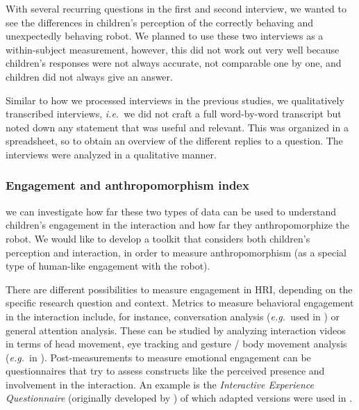 \documentclass{sig-alternate}
\newcommand{\eg}{{\textit{e.g.~}}}
\newcommand{\ie}{{\textit{i.e.~}}}
\begin{document}
With several recurring questions in the first and second interview, we wanted to
see the differences in children's perception of the correctly behaving and
unexpectedly behaving robot. We planned to use these two interviews as a
within-subject measurement, however, this did not work out very well because
children's responses were not always accurate, not comparable one by one, and
children did not always give an answer.	




Similar to how we processed interviews in the previous studies, we qualitatively
transcribed interviews, \ie we did not craft a full word-by-word transcript but
noted down any statement that was useful and relevant. This was organized in a
spreadsheet, so to obtain an overview of the different replies to a question.
The interviews were analyzed in a qualitative manner.	




\subsubsection{Engagement and anthropomorphism index}

we can investigate how far these two types of data can
be used to understand children's engagement in the interaction and how far they
anthropomorphize the robot. We would like to develop a toolkit that considers
both children's perception and interaction, in order to measure anthropomorphism
(as a special type of human-like engagement with the robot).	


There are different possibilities to measure engagement in HRI, depending on the
specific research question and context. Metrics to measure behavioral engagement
in the interaction include, for instance, conversation analysis (\eg used in
\cite{short_no_2010}) or general attention analysis. These can be studied by
analyzing interaction videos in terms of head movement, eye tracking and gesture
/ body movement analysis (\eg in \cite{sidner_explorations_2005}).
Post-measurements to measure emotional engagement can be questionnaires that try
to assess constructs like the perceived presence and involvement in the
interaction. An example is the \textit{Interactive Experience Questionnaire}
(originally developed by \cite{lombard_measuring_2000}) of which adapted
versions were used in
\cite{kidd_effect_2004,bainbridge_effect_2008,short_no_2010}.
\end{document}
